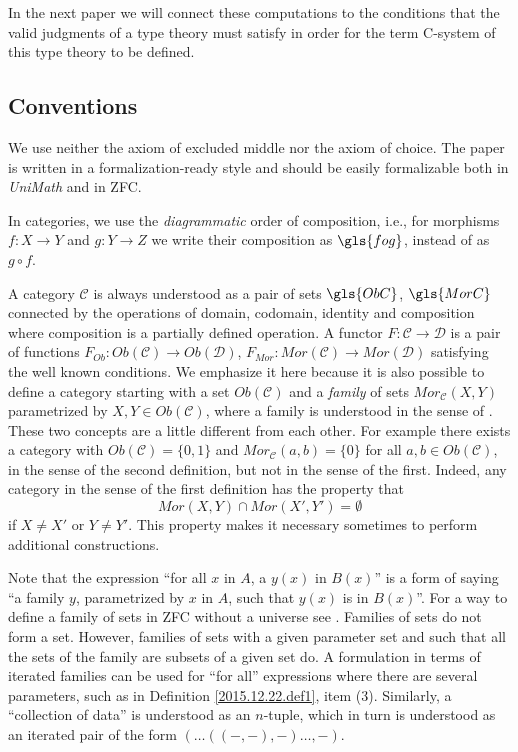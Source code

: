 \documentclass[onecolumn,12pt]{amsart}
\newcommand{\DG}[1]{}
\renewcommand{\DG}[1]{\todo[color=green!30]{DG: #1}\PackageWarning{TODO}{DG: #1}}
\numberwithin{proposition}{subsection}
\newcommand{\sr}{\rightarrow}
\newcommand{\C}{{\mathcal C}}
\newcommand{\D}{{\mathcal D}}
\begin{document}
In the next paper we will connect these computations to the conditions that the
valid judgments of a type theory must satisfy in order for the term C-system
of this type theory to be defined.

\subsection{Conventions}

We use neither the axiom of excluded middle nor the axiom of choice. The paper
is written in a formalization-ready style and should be easily formalizable
both in {\em UniMath} and in ZFC.

In categories, we use the {\em diagrammatic} order of composition, i.e., for morphisms $f:X\sr Y$
and $g:Y\sr Z$ we write their composition as $\gls{fog}$, instead of as $g \circ f$.

A category $\C$ is always understood as a pair of sets $\gls{ObC}$, $\gls{MorC}$
connected by the operations of domain, codomain, identity and composition where
composition is a partially defined operation. A functor $F:\C\sr \D$ is a pair
of functions $F_{Ob}:Ob(\C)\sr Ob(\D)$, $F_{Mor}:Mor(\C)\sr Mor(\D)$ satisfying
the well known conditions. We emphasize it here because it is also possible to
define a category starting with a set $Ob(\C)$ and a {\em family} of sets
$Mor_{\C}(X,Y)$ parametrized by $X,Y\in Ob(\C)$, where a {family} is understood
in the sense of \cite[Remark 3.9]{fromunivwithPiI}. These two concepts are a
little different from each other. For example there exists a category with
$Ob(\C)=\{0,1\}$ and $Mor_{\C}(a,b)=\{0\}$ for all $a,b\in Ob(\C)$, in the
sense of the second definition, but not in the sense of the first. Indeed, any
category in the sense of the first definition has the property that
%
$$Mor(X,Y)\cap Mor(X',Y')=\emptyset$$
%
if $X\ne X'$ or $Y\ne Y'$. This property makes it necessary sometimes to
perform additional constructions.

Note that the expression ``for all $x$ in $A$, a $y(x)$ in $B(x)$'' is a form
of saying ``a family $y$, parametrized by $x$ in $A$, such that $y(x)$ is in
$B(x)$''. For a way to define a family of sets in ZFC without a universe
see \cite[Remark 3.9]{fromunivwithPiI}. Families of sets do not form a
set. However, families of sets with a given parameter set and such that all the
sets of the family are subsets of a given set do. A formulation in terms of
iterated families can be used for ``for all'' expressions where there are
several parameters, such as in Definition \ref{2015.12.22.def1}, item (3). Similarly, a
``collection of data'' is understood as an $n$-tuple, which in turn is understood as
an iterated pair of the form $(\dots((-,-),-)\dots,-)$.
\end{document}
